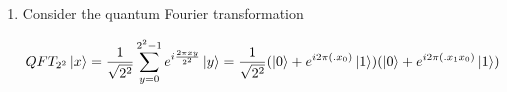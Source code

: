 \documentclass[11pt]{article}
\begin{document}
\begin{enumerate}
\begin{enumerate}
		            Grouping all $\ket{\Psi_0}$ together results in

		            \begin{equation*}
			            \Big[\cos(2k+1)\theta\cos(2\theta)-\sin(2k+1)\theta\sin(2\theta)\Big]\ket{\Psi_0}
		            \end{equation*}

		            Applying trig identity $\cos(A)\cos(B)-\sin(A)sin(B) = cos(A+B)$

		            \begin{equation*}
			            \cos(2k+1 + 2)\theta = \cos(2k+3)\theta \ket{\Psi_0}
		            \end{equation*}

		            Grouping all $\ket{\Psi_1}$ together results in

		            \begin{equation*}
			            \Big[\cos(2k+1)\theta\sin(2\theta) + \sin(2k+1)\theta\cos(2\theta)\Big]\ket{\Psi_1}
		            \end{equation*}

		            Applying trig identity $\cos(A)\sin(B) + \sin(A)\cos(B) = \sin(A+B)$

		            \begin{equation*}
			            \sin(2+2k+1)\theta = \sin(2k+3)\theta\ket{\Psi_1}
		            \end{equation*}

		            This proves that the claim holds true for $k+1$.

		            Thus the equation

		            \begin{equation*}
			            Q^k U\ket{O^{\otimes n}} = \cos(2k + 1)\theta \ket{\Psi_0} + \sin(2k+1)\theta\ket{\Psi_1}, k \in \mathbb{Z}_+
		            \end{equation*}

		            holds true by induction.

	      \end{enumerate}

	\item
	      Consider the quantum Fourier transformation


	      \begin{equation*}
		      QFT_{2^2}\ket{x} = \frac{1}{\sqrt{2^2}} \sum_{y=0}^{2^{2}-1}e^{i \frac{2\pi xy}{2^2}}\ket{y} = \frac{1}{\sqrt{2^2}}(\ket{0} + e^{i2{\pi}(.x_0)}\ket{1})(\ket{0}+e^{i2{\pi}(.x_1x_0)}\ket{1})
	      \end{equation*}


\end{enumerate}
\end{document}
